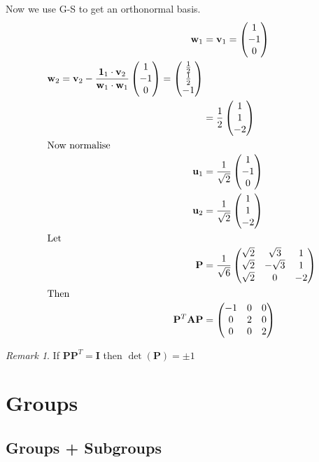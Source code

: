 \documentclass{report}
\theoremstyle{remark}
\newtheorem{remark}[theorem]{Remark}
\theoremstyle{definition}
\theoremstyle{definition}
\theoremstyle{theorem}
\renewcommand{\v}[1]{\mathbf{#1}}
\providecommand{\vectiii}[3]{\begin{pmatrix}#1\\#2\\#3\end{pmatrix}}
\begin{document}
Now we use G-S to get an orthonormal basis.
\begin{align*}
    \v{w}_1&=\v{v}_1=\vectiii{1}{-1}{0}\\
    \v{w}_2=\v{v}_2-\frac{\v{1}_1\cdot\v{v}_2}{\v{w}_1\cdot\v{w}_1}\vectiii{1}{-1}{0}=\vectiii{\frac{1}{2}}{\frac{1}{2}}{-1}\\
    &=\frac{1}{2}\vectiii{1}{1}{-2}\\
    \intertext{Now normalise}
    \v{u}_1&=\frac{1}{\sqrt{2}}\vectiii{1}{-1}{0}\\
    \v{u}_2&=\frac{1}{\sqrt{2}}\vectiii{1}{1}{-2}\\
    \intertext{Let}
    \v{P}&=\frac{1}{\sqrt{6}}\begin{pmatrix}
    \sqrt{2}&\sqrt{3}&1\\
    \sqrt{2}&-\sqrt{3}&1\\
    \sqrt{2}&0&-2
    \end{pmatrix}\\
    \intertext{Then}
    \v{P}^T\v{AP}&=\begin{pmatrix}
    -1&0&0\\
    0&2&0\\
    0&0&2
    \end{pmatrix}
\end{align*}
\begin{remark}
If $\v{PP}^T=\v{I}$ then $\det(\v{P})=\pm1$
\end{remark}
\chapter{Groups}
\section{Groups + Subgroups}
\end{document}

